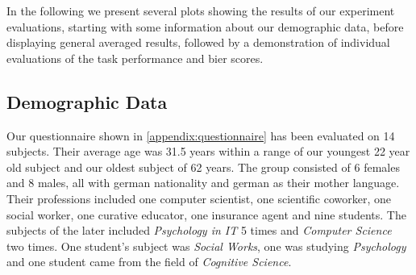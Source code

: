\documentclass[../main/main.tex]{subfiles}
\begin{document}
In the following we present several plots showing the results of our experiment evaluations, starting with some information about our demographic data, before displaying general averaged results, followed by a demonstration of individual evaluations of the task performance and bier scores.
\subsection{Demographic Data}
Our questionnaire shown in \ref{appendix:questionnaire} has been evaluated on 14 subjects. Their average age was 31.5 years within a range of our youngest 22 year old subject and our oldest subject of 62 years. The group consisted of 6 females and 8 males, all with german nationality and german as their mother language. Their professions included one computer scientist, one scientific coworker, one social worker, one curative educator, one insurance agent and nine students. The subjects of the later included \textit{Psychology in IT} 5 times and \textit{Computer Science} two times. One student's subject was \textit{Social Works}, one was studying \textit{Psychology} and one student came from the field of \textit{Cognitive Science}.
\end{document}
